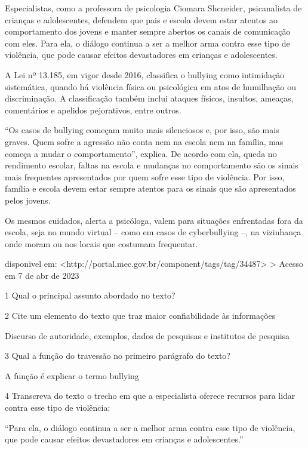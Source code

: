 {Especialistas, como a professora de psicologia Ciomara Shcneider,
psicanalista de crianças e adolescentes, defendem que pais e escola
devem estar atentos ao comportamento dos jovens e manter sempre abertos
os canais de comunicação com eles. Para ela, o diálogo continua a ser a
melhor arma contra esse tipo de violência, que pode causar efeitos
devastadores em crianças e adolescentes.

A Lei nº 13.185, em vigor desde 2016, classifica o bullying como
intimidação sistemática, quando há violência física ou psicológica em
atos de humilhação ou discriminação. A classificação também inclui
ataques físicos, insultos, ameaças, comentários e apelidos pejorativos,
entre outros.

``Os casos de bullying começam muito mais silenciosos e, por isso, são
mais graves. Quem sofre a agressão não conta nem na escola nem na
família, mas começa a mudar o comportamento'', explica. De acordo com
ela, queda no rendimento escolar, faltas na escola e mudanças no
comportamento são os sinais mais frequentes apresentados por quem sofre
esse tipo de violência. Por isso, família e escola devem estar sempre
atentos para os sinais que são apresentados pelos jovens.

Os mesmos cuidados, alerta a psicóloga, valem para situações enfrentadas
fora da escola, seja no mundo virtual -- como em casos de cyberbullying
--, na vizinhança onde moram ou nos locais que costumam frequentar.

disponivel em:
\textless http://portal.mec.gov.br/component/tags/tag/34487\textgreater{}
\textgreater{} Acesso em 7 de abr de 2023

\num{1} Qual o principal assunto abordado no texto?


\num{2} Cite um elemento do texto que traz maior confiabilidade às informações

Discurso de autoridade, exemplos, dados de pesquisas e institutos de
pesquisa

\num{3} Qual a função do travessão no primeiro parágrafo do texto?

A função é explicar o termo bullying

\num{4} Transcreva do texto o trecho em que a especialista oferece recursos para lidar contra esse tipo de violência:

``Para ela, o diálogo continua a ser a melhor arma contra esse tipo de
violência, que pode causar efeitos devastadores em crianças e
adolescentes.''

}
